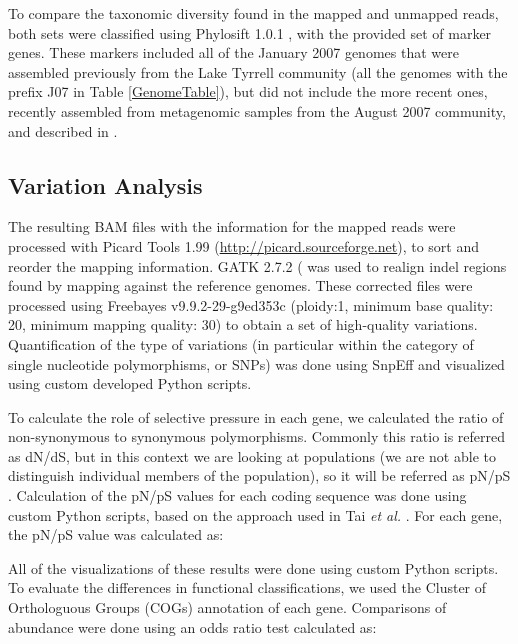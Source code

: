 To compare the taxonomic diversity found in the mapped and unmapped reads, both sets were classified using Phylosift 1.0.1 \cite{Darling:2014ej}, with the provided set of marker genes. These markers included all of the January 2007 genomes that were assembled previously from the Lake Tyrrell community \cite{Narasingarao:2012kp,Podell:2013kx} (all the genomes with the prefix J07 in Table \ref{GenomeTable}), but did not include the more recent ones, recently assembled from metagenomic samples from the August 2007 community, and described in \cite{Podell:2013fp}.

\subsection{Variation Analysis}

The resulting BAM files with the information for the mapped reads were processed with Picard Tools 1.99 (\url{http://picard.sourceforge.net}), to sort and reorder the mapping information. GATK 2.7.2 (\cite{DePristo:2011fo} was used to realign indel regions found by mapping against the reference genomes. These corrected files were processed using Freebayes v9.9.2-29-g9ed353c \cite{Garrison:2012wb} (ploidy:1, minimum base quality: 20, minimum mapping quality: 30) to obtain a set of high-quality variations. Quantification of the type of variations (in particular within the category of single nucleotide polymorphisms, or SNPs) was done using SnpEff \cite{Cingolani:2012cz} and visualized using custom developed Python scripts. 

To calculate the role of selective pressure in each gene, we calculated the ratio of non-synonymous to synonymous polymorphisms. Commonly this ratio is referred as dN/dS, but in this context we are looking at populations (we are not able to distinguish individual members of the population), so it will be referred as pN/pS \cite{Schloissnig:2012hx}. Calculation of the pN/pS values for each coding sequence was done using custom Python scripts, based on the approach used in Tai \textit{et al.} \cite{Tai:2011jo}. For each gene, the pN/pS value was calculated as:

\begin{center}
\end{center}

All of the visualizations of these results were done using custom Python scripts. To evaluate the differences in functional classifications, we used the Cluster of Orthologuous Groups (COGs) \cite{Tatusov:2003fk} annotation of each gene. Comparisons of abundance were done using an odds ratio test calculated as:

